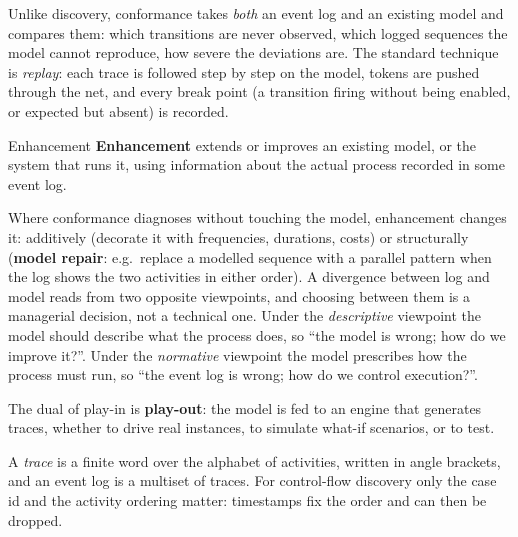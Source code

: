 Unlike discovery, conformance takes \emph{both} an event log and an existing model and compares them: which transitions are never observed, which logged sequences the model cannot reproduce, how severe the deviations are. The standard technique is \emph{replay}: each trace is followed step by step on the model, tokens are pushed through the net, and every break point (a transition firing without being enabled, or expected but absent) is recorded.

\begin{definitionbox}{Enhancement}
\textbf{Enhancement} extends or improves an existing model, or the system that runs it, using information about the actual process recorded in some event log.
\end{definitionbox}

Where conformance diagnoses without touching the model, enhancement changes it: additively (decorate it with frequencies, durations, costs) or structurally (\textbf{model repair}: e.g.\ replace a modelled sequence with a parallel pattern when the log shows the two activities in either order). A divergence between log and model reads from two opposite viewpoints, and choosing between them is a managerial decision, not a technical one. Under the \emph{descriptive} viewpoint the model should describe what the process does, so ``the model is wrong; how do we improve it?''. Under the \emph{normative} viewpoint the model prescribes how the process must run, so ``the event log is wrong; how do we control execution?''.

The dual of play-in is \textbf{play-out}: the model is fed to an engine that generates traces, whether to drive real instances, to simulate what-if scenarios, or to test.

A \emph{trace} is a finite word over the alphabet of activities, written in angle brackets, and an event log is a multiset of traces. For control-flow discovery only the case id and the activity ordering matter: timestamps fix the order and can then be dropped.

